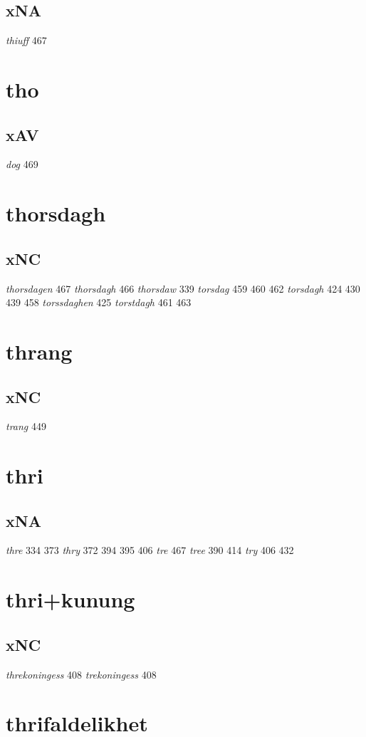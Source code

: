 \documentclass[a4paper,twocolumn]{article}
\begin{document}
\subsection{xNA}
\label{sec:org9fb5694}
\emph{thiuff} 467 
\section{tho}
\label{sec:org8c42b25}
\subsection{xAV}
\label{sec:org1080da2}
\emph{dog} 469 
\section{thorsdagh}
\label{sec:org3e2be85}
\subsection{xNC}
\label{sec:org57714c0}
\emph{thorsdagen} 467 \emph{thorsdagh} 466 \emph{thorsdaw} 339 \emph{torsdag} 459 460 462 \emph{torsdagh} 424 430 439 458 \emph{torssdaghen} 425 \emph{torstdagh} 461 463 
\section{thrang}
\label{sec:orgc78a9a6}
\subsection{xNC}
\label{sec:org754ea7b}
\emph{trang} 449 
\section{thri}
\label{sec:org9922b18}
\subsection{xNA}
\label{sec:orge9064a0}
\emph{thre} 334 373 \emph{thry} 372 394 395 406 \emph{tre} 467 \emph{tree} 390 414 \emph{try} 406 432 
\section{thri+kunung}
\label{sec:orgdedf5a1}
\subsection{xNC}
\label{sec:orgc4c769a}
\emph{threkoningess} 408 \emph{trekoningess} 408 
\section{thrifaldelikhet}
\label{sec:org7a3cf56}
\end{document}
